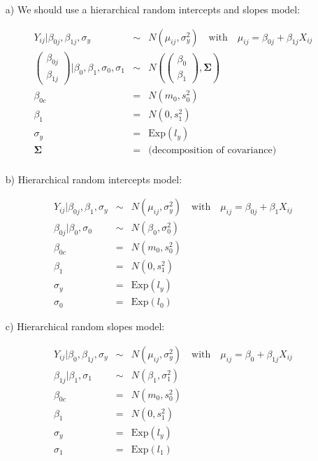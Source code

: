 \documentclass[fontsize=11pt,DIV=18,parskip=half]{scrartcl}
\begin{document}
\begin{itemize}
\item[a)] We should use a hierarchical random intercepts and slopes model:

\begin{eqnarray*}
Y_{ij}|\beta_{0j},\beta_{1j},\sigma_y &\sim& N(\mu_{ij}, \sigma_y^2) \quad \text{with} \quad \mu_{ij} = \beta_{0j} + \beta_{1j} X _{ij}\\
\begin{pmatrix} \beta_{0j}\\ \beta_{1j} \end{pmatrix}\bigg|\beta_0, \beta_1, \sigma_0, \sigma_1 &\sim & N\left( \begin{pmatrix} \beta_{0}\\ \beta_{1} \end{pmatrix}, \boldsymbol{\Sigma} \right)\\
\beta_{0c} &=& N(m_0, s_0^2) \\
\beta_1 &=& N(0, s_1^2)\\
\sigma_y &=& \text{Exp}(l_y) \\
\boldsymbol{\Sigma} &=& \text{(decomposition of covariance)}\\
\end{eqnarray*}

\item[b)] Hierarchical random intercepts model:

\begin{eqnarray*}
Y_{ij}|\beta_{0j},\beta_1,\sigma_y &\sim& N(\mu_{ij}, \sigma_y^2) \quad \text{with} \quad \mu_{ij} = \beta_{0j} + \beta_{1} X _{ij}\\
\beta_{0j} |\beta_0, \sigma_0 &\sim & N\left( \beta_0, \sigma_0^2 \right)\\
\beta_{0c} &=& N(m_0, s_0^2) \\
\beta_1 &=& N(0, s_1^2)\\
\sigma_y &=& \text{Exp}(l_y) \\
\sigma_0 &=& \text{Exp}(l_0)
\end{eqnarray*}


\item[c)] Hierarchical random slopes model:

\begin{eqnarray*}
Y_{ij}|\beta_{0},\beta_{1j},\sigma_y &\sim& N(\mu_{ij}, \sigma_y^2) \quad \text{with} \quad \mu_{ij} = \beta_{0} + \beta_{1j} X _{ij}\\
\beta_{1j} |\beta_1, \sigma_1 &\sim & N\left( \beta_1, \sigma_1^2 \right)\\
\beta_{0c} &=& N(m_0, s_0^2) \\
\beta_1 &=& N(0, s_1^2)\\
\sigma_y &=& \text{Exp}(l_y) \\
\sigma_1 &=& \text{Exp}(l_1)
\end{eqnarray*}

\end{itemize}
\end{document}
